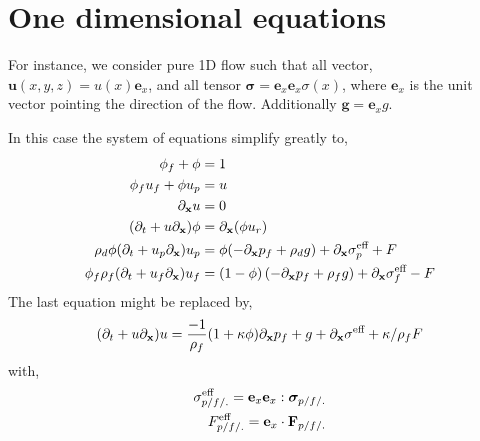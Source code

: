 \documentclass[11pt]{My_preprint}
\begin{document}
\section{One dimensional equations}

For instance, we consider pure 1D flow such that all vector, $\textbf{u}(x,y,z)= u(x)  \textbf{e}_x$, and all tensor $\bm\sigma = \textbf{e}_x \textbf{e}_x \sigma(x)$, where $\textbf{e}_x$ is the unit vector pointing the direction of the flow.
Additionally $\textbf{g}= \textbf{e}_x g$. 

In this case the system of equations simplify greatly to, 
\begin{align}
    \phi_f + \phi &= 1\\
    \phi_f u_f + 
    \phi u_p&=u\\
    \pddx u &= 0\\
    (\pddt + u \pddx )\phi
    &=
    \pddx (\phi u_r)\\
    \rho_d \phi (\pddt + u_p \pddx)u_p
    &=
    \phi( -  \pddx p_f 
    + \rho_d   g)
    + \pddx \sigma_p^\text{eff}
    +  F
    \\
    \phi_f \rho_f(\pddt + u_f  \pddx) u_f
    &= (1-\phi) 
    \left( - \pddx p_f %
    + \rho_f g\right)
    + \pddx \sigma_f^\text{eff}
    - F
\end{align}
The last equation might be replaced by, 
\begin{equation}
    (\pddt + u \pddx )u
    = 
    \frac{-1}{\rho_f}(1 + \kappa \phi)
        \pddx p_f %
    + g
    + \pddx \sigma^\text{eff}
    + \kappa/\rho_f  F
    \label{eq:u_dt}
\end{equation}
with, 
\begin{align}
    \sigma_{p/f/.}^\text{eff} = \textbf{e}_x \textbf{e}_x : \bm\sigma_{p/f/.}\\
    F_{p/f/.}^\text{eff} = \textbf{e}_x \cdot \textbf F_{p/f/.}
\end{align}



\end{document}
